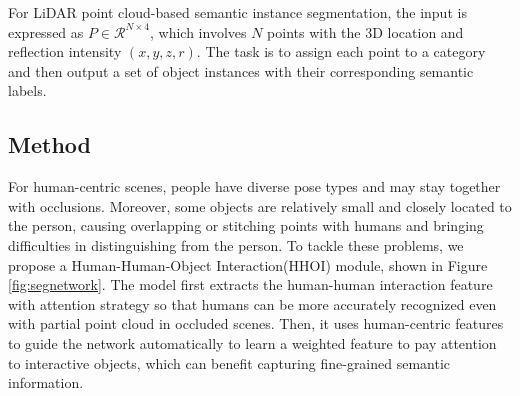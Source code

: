 For LiDAR point cloud-based semantic instance segmentation, the input is expressed as $ P \in \mathcal{R}^{N \times 4}$, which involves $N$ points with the 3D location and reflection intensity $(x, y, z, r)$. The task is to assign each point to a category and then output a set of object instances with their corresponding semantic labels.



\subsection{Method}

For human-centric scenes, people have diverse pose types and may stay together with occlusions. Moreover, some objects are relatively small and closely located to the person, causing overlapping or stitching points with humans and bringing difficulties in distinguishing from the person.
To tackle these problems, we propose a Human-Human-Object Interaction(HHOI) module, shown in Figure \ref{fig:segnetwork}. The model first extracts the human-human interaction feature with attention strategy so that humans can be more accurately recognized even with partial point cloud in occluded scenes.
Then, it uses human-centric features to guide the network automatically to learn a weighted feature to pay attention to interactive objects, which can benefit capturing fine-grained semantic information.



